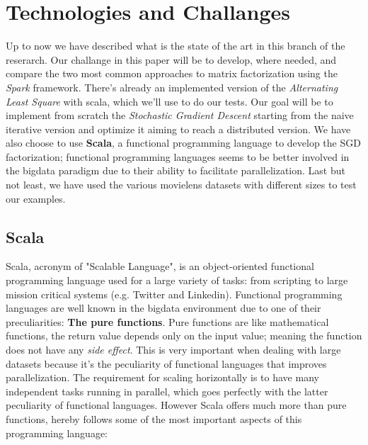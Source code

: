 \documentclass{sig-alternate-05-2015}
\begin{document}
\section{Technologies and Challanges}

Up to now we have described what is the
state of the art in this branch of the reserarch.
Our challange in this paper will be to develop, where needed,
and compare the two most common approaches to matrix factorization using
the \textit{Spark} framework. There's already an implemented version
of the \textit{Alternating Least Square} with scala, which we'll use
to do our tests. Our goal will be to implement from scratch
the \textit{Stochastic Gradient Descent}
starting from the naive iterative version and optimize it aiming to reach
a distributed version.
We have also choose to use \textbf{Scala}, a functional programming language
to develop the SGD factorization; functional programming languages seems
to be better involved in the bigdata paradigm due to their ability
to facilitate parallelization.
Last but not least, we have used the various movielens datasets with different sizes
to test our examples.

\subsection{Scala}
Scala, acronym of "Scalable Language", is an object-oriented functional programming
language used for a large variety of tasks: from scripting to large mission
critical systems (e.g. Twitter and Linkedin).
Functional programming languages are well known in the bigdata environment
due to one of their preculiarities: \textbf{The pure functions}.
Pure functions are like mathematical functions, the return value depends only
on the input value; meaning the function does not have any \textit{side effect}.
This is very important when dealing with large datasets because it's the peculiarity
of functional languages that improves parallelization. The requirement
for scaling horizontally is to have many independent tasks running in parallel,
which goes perfectly with the latter peculiarity of functional languages.
However Scala offers much more than pure functions, hereby follows some of
the most important aspects of this programming language:\\
\end{document}
